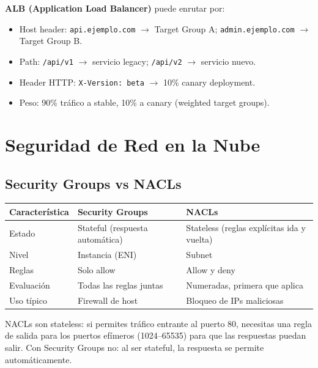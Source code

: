\begin{ejemplo}
\textbf{ALB (Application Load Balancer)} puede enrutar por:
\begin{itemize}
    \item Host header: \texttt{api.ejemplo.com} $\to$ Target Group A;
          \texttt{admin.ejemplo.com} $\to$ Target Group B.
    \item Path: \texttt{/api/v1} $\to$ servicio legacy; \texttt{/api/v2} $\to$ servicio nuevo.
    \item Header HTTP: \texttt{X-Version: beta} $\to$ 10\% canary deployment.
    \item Peso: 90\% tráfico a stable, 10\% a canary (weighted target groups).
\end{itemize}
\end{ejemplo}

\section{ Seguridad de Red en la Nube}

\subsection{Security Groups vs NACLs}

\begin{center}
\begin{tabular}{lll}
\toprule
\textbf{Característica} & \textbf{Security Groups} & \textbf{NACLs} \\
\midrule
Estado         & Stateful (respuesta automática) & Stateless (reglas explícitas ida y vuelta) \\
Nivel          & Instancia (ENI)                 & Subnet \\
Reglas         & Solo allow                      & Allow y deny \\
Evaluación     & Todas las reglas juntas          & Numeradas, primera que aplica \\
Uso típico     & Firewall de host                & Bloqueo de IPs maliciosas \\
\bottomrule
\end{tabular}
\end{center}

\begin{cuidado}
NACLs son stateless: si permites tráfico entrante al puerto 80, necesitas una regla
de salida para los puertos efímeros (1024--65535) para que las respuestas puedan salir.
Con Security Groups no: al ser stateful, la respuesta se permite automáticamente.
\end{cuidado}

